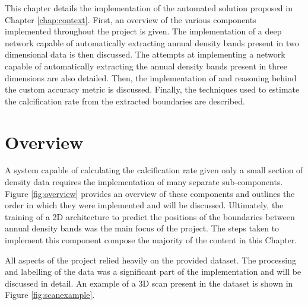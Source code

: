 This chapter details the implementation of the automated solution proposed in Chapter \ref{chap:context}. First, an overview of the various components implemented throughout the project is given. The implementation of a deep network capable of automatically extracting annual density bands present in two dimensional data is then discussed. The attempts at implementing a network capable of automatically extracting the annual density bands present in three dimensions are also detailed. Then, the implementation of and reasoning behind the custom accuracy metric is discussed. Finally, the techniques used to estimate the calcification rate from the extracted boundaries are described.

\section{Overview}

A system capable of calculating the calcification rate given only a small section of density data requires the implementation of many separate sub-components. Figure \ref{fig:overview} provides an overview of these components and outlines the order in which they were implemented and will be discussed. Ultimately, the training of a 2D architecture to predict the positions of the boundaries between annual density bands was the main focus of the project. The steps taken to implement this component compose the majority of the content in this Chapter.

All aspects of the project relied heavily on the provided dataset. The processing and labelling of the data was a significant part of the implementation and will be discussed in detail. An example of a 3D scan present in the dataset is shown in Figure \ref{fig:scanexample}.

